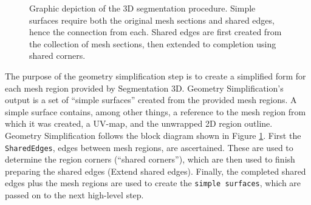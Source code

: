 \begin{figure}[htb]
	\centering
{}
	\caption{%
Graphic depiction of the 3D segmentation procedure.
Simple surfaces require both the original mesh sections and shared edges, hence the connection from each.
Shared edges are first created from the collection of mesh sections, then extended to completion using shared corners.
}
	\label{fig:GeoSimp}
\end{figure}

The purpose of the geometry simplification step is to create a simplified form for each mesh region provided by Segmentation 3D.
Geometry Simplification's output is a set of ``simple surfaces'' created from the provided mesh regions.
A simple surface contains, among other things, a reference to the mesh region from which it was created, a UV-map, and the unwrapped 2D region outline.
Geometry Simplification follows the block diagram shown in Figure \ref{fig:GeoSimp}.
First the \verb|SharedEdges|, edges between mesh regions, are ascertained.
These are used to determine the region corners (``shared corners''), which are then used to finish preparing the shared edges (Extend shared edges).
Finally, the completed shared edges plus the mesh regions are used to create the \verb|simple surfaces|, which are passed on to the next high-level step.

